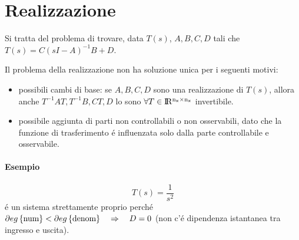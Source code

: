 \documentclass[../main.tex]{subfiles}
\begin{document}
	\section{Realizzazione}
		Si tratta del problema di trovare, data $ T(s) $, $ A, B, C, D $ tali che $ T(s) = C(sI-A)^{-1}B + D $.
		
		Il problema della realizzazione non ha soluzione unica per i seguenti motivi:
		\begin{itemize}
			\item 
				possibili cambi di base: se $ A, B, C, D $ sono una realizzazione di $ T(s) $, allora anche $ T^{-1}AT, T^{-1}B, CT, D $ lo sono $ \forall T \in \rm I\!R^{n_x \times n_x} $ invertibile.
			\item 
				possibile aggiunta di parti non controllabili o non osservabili, dato che la funzione di trasferimento \'e influenzata solo dalla parte controllabile e osservabile.
		\end{itemize}
	
		\paragraph{Esempio}
		\[
		T(s) = \dfrac{1}{s^2}				
		\]
		\'e un sistema strettamente proprio perch\'e $ \partial eg \left\lbrace \text{num} \right\rbrace < \partial eg \left\lbrace \text{denom} \right\rbrace \quad\Rightarrow\quad D = 0 $ (non c'\'e dipendenza istantanea tra ingresso e uscita).
		
\end{document}
